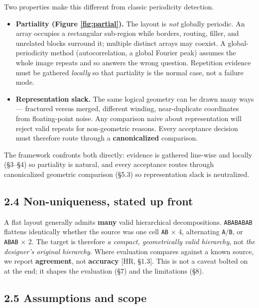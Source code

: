 \documentclass[
  11pt,
]{article}
\providecommand{\tightlist}{%
  \setlength{\itemsep}{0pt}\setlength{\parskip}{0pt}}
\begin{document}
Two properties make this different from classic periodicity detection.

\begin{itemize}
\tightlist
\item
  \textbf{Partiality (Figure \ref{fig:partial}).} The layout is
  \emph{not} globally periodic. An array occupies a rectangular
  sub-region while borders, routing, filler, and unrelated blocks
  surround it; multiple distinct arrays may coexist. A
  global-periodicity method (autocorrelation, a global Fourier peak)
  assumes the whole image repeats and so answers the wrong question.
  Repetition evidence must be gathered \emph{locally} so that partiality
  is the normal case, not a failure mode.
\item
  \textbf{Representation slack.} The same logical geometry can be drawn
  many ways --- fractured versus merged, different winding,
  near-duplicate coordinates from floating-point noise. Any comparison
  naive about representation will reject valid repeats for non-geometric
  reasons. Every acceptance decision must therefore route through a
  \textbf{canonicalized} comparison.
\end{itemize}

The framework confronts both directly: evidence is gathered line-wise
and locally (§3--§4) so partiality is natural, and every acceptance
routes through canonicalized geometric comparison (§5.3) so
representation slack is neutralized.

\subsection{2.4 Non-uniqueness, stated up
front}\label{non-uniqueness-stated-up-front}

A flat layout generally admits \textbf{many} valid hierarchical
decompositions. \texttt{ABABABAB} flattens identically whether the
source was one cell \texttt{AB} × 4, alternating \texttt{A}/\texttt{B},
or \texttt{ABAB} × 2. The target is therefore \emph{a compact,
geometrically valid hierarchy}, not \emph{the designer's original
hierarchy}. Where evaluation compares against a known source, we report
\textbf{agreement}, not \textbf{accuracy} {[}HR, §1.3{]}. This is not a
caveat bolted on at the end; it shapes the evaluation (§7) and the
limitations (§8).

\subsection{2.5 Assumptions and scope}\label{assumptions-and-scope}
\end{document}
